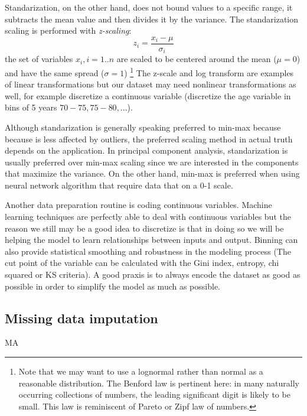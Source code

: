 \documentclass[11pt]{article}
\theoremstyle{definition}
\theoremstyle{remark}
\begin{document}
Standarization, on the other hand, does not bound values to a specific range, it subtracts the mean value and then divides it by the variance. 
The standarization scaling is performed with \emph{z-scaling}:
\begin{equation} \label{eq:scaling}
z_i = \frac{x_i -\mu}{\sigma_i}
\end{equation}
the set of variables $x_i, i=1..n$ are scaled to be centered around the mean ($\mu=0$) and have the same spread ($\sigma=1$) \footnote{Note that we may want to use a lognormal rather than normal as a reasonable distribution. The Benford law is pertinent here: in many naturally occurring collections of numbers, the leading significant digit is likely to be small. This law is reminiscent of Pareto or Zipf law of numbers.} %
The z-scale and log transform are examples of linear transformations but our dataset may need nonlinear transformations as well, for example discretize a continuous variable (discretize the age variable in bins of 5 years $70-75, 75-80, ...$). 

Although standarization is generally speaking preferred to min-max because because is less affected by outliers, the preferred scaling method in actual truth depends on the application. In principal component analysis, standarization is usually preferred over min-max scaling since we are interested in the components that maximize the variance.
On the other hand, min-max is preferred when using neural network algorithm that require data that on a 0-1 scale.

Another data preparation routine is coding continuous variables. Machine learning techniques are perfectly able to deal with continuous variables but the reason we still may be a good idea to discretize is that in doing so we will be helping the model to learn relationships between inputs and output. Binning can also provide statistical smoothing and robustness in the modeling process (The cut point of the variable can be calculated with the Gini index, entropy, chi squared or KS criteria).
A good praxis is to always encode the dataset as good as possible in order to simplify the model as much as possible.

\subsection{Missing data imputation}
\label{sse:miss}
MA
\end{document}
